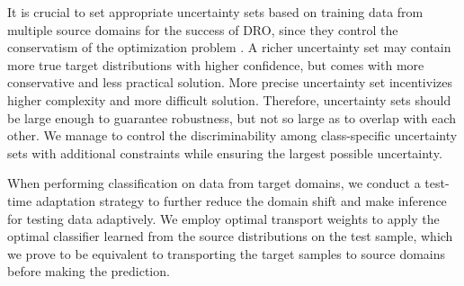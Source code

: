 \documentclass[journal]{IEEEtran}
\begin{document}
It is crucial to set appropriate uncertainty sets based on training data from multiple source domains for the success of DRO, since they control the conservatism of the optimization problem \cite{mohajerin2018data}. A richer uncertainty set may contain more true target distributions with higher confidence, but comes with more conservative and less practical solution.
More precise uncertainty set incentivizes higher complexity and more difficult solution.
Therefore, uncertainty sets should be large enough to guarantee robustness, but not so large as to overlap with each other. 
We manage to control the discriminability among class-specific uncertainty sets with additional constraints while ensuring the largest possible uncertainty.


When performing classification on data from target domains, 
we conduct a test-time adaptation strategy to further reduce the domain shift and make inference for testing data adaptively.
We employ optimal transport weights to apply the optimal classifier learned from the source distributions on the test sample, which we prove to be equivalent to transporting the target samples to source domains before making the prediction.
\end{document}
